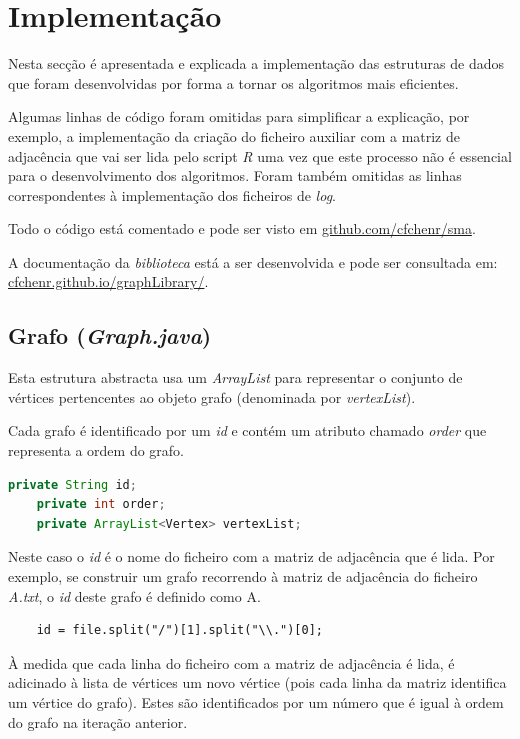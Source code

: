\documentclass[a4paper,12pt]{report}
\begin{document}
\chapter{Implementação}

Nesta secção é apresentada e explicada a implementação das estruturas de dados que foram desenvolvidas por forma a tornar os algoritmos mais eficientes.

Algumas linhas de código foram omitidas para simplificar a explicação, por exemplo, a implementação da criação do ficheiro auxiliar com a matriz de adjacência que vai ser lida pelo script \textit{R} uma vez que este processo não é essencial para o desenvolvimento dos algoritmos.
Foram também omitidas as linhas correspondentes à implementação dos ficheiros de \textit{log}.

Todo o código está comentado e pode ser visto em  \href{https://github.com/cfchenr/sma}{github.com/cfchenr/sma}.

A documentação da \textit{biblioteca} está a ser desenvolvida e pode ser consultada em: \href{https://cfchenr.github.io/graphLibrary/}{cfchenr.github.io/graphLibrary/}.

\section{Grafo (\textit{Graph.java})}

Esta estrutura abstracta usa um \textit{ArrayList} para representar o conjunto de vértices pertencentes ao objeto grafo (denominada por \textit{vertexList}).

Cada grafo é identificado por um \textit{id} e contém um atributo chamado \textit{order} que representa a ordem do grafo.

\begin{lstlisting}[language=Java]
    private String id;
    private int order;
    private ArrayList<Vertex> vertexList;
\end{lstlisting}

Neste caso o \textit{id} é o nome do ficheiro com a matriz de adjacência que é lida. Por exemplo, se construir um grafo recorrendo à matriz de adjacência do ficheiro \textit{A.txt}, o \textit{id} deste grafo é definido como A.

\begin{lstlisting}
    id = file.split("/")[1].split("\\.")[0];
\end{lstlisting}

À medida que cada linha do ficheiro com a matriz de adjacência é lida, é adicinado à lista de vértices um novo vértice (pois cada linha da matriz identifica um vértice do grafo). Estes são identificados por um número que é igual à ordem do grafo na iteração anterior.
\end{document}
